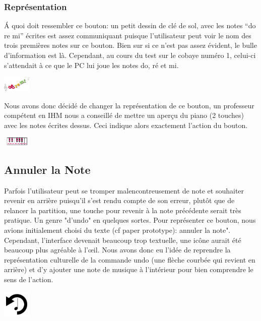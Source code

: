 \documentclass{article}
\begin{document}
\subsubsection{Représentation}
\'A quoi doit ressembler ce bouton: un petit dessin de clé de sol, avec les notes ``do re mi'' écrites est assez communiquant puisque
l'utilisateur peut voir le nom des trois premières notes sur ce bouton. Bien sur si ce n'est pas assez évident, le bulle d'information
est là. Cependant, au cours du test sur le cobaye numéro 1, celui-ci s'attendait à ce que le PC lui joue les notes do, ré et mi.
\begin{center}
\includegraphics[width = 50px]{./images/doremi.png}
\end{center}
Nous avons donc décidé de changer la représentation de ce bouton, un professeur compétent en IHM nous a conseillé de mettre
 un aperçu du piano (2 touches) avec les notes écrites dessus. Ceci indique alors exactement l'action du bouton.
 
\begin{center}
\includegraphics[width = 50px]{./images/doremi2.png}
\end{center}

\subsection{Annuler la Note}
Parfois l'utilisateur peut se tromper malencontreusement de note et souhaiter revenir en arrière puisqu'il s'est rendu compte de son erreur,
plutôt que de relancer la partition, une touche pour revenir à la note précédente serait très pratique. Un genre "d'undo" en quelques sortes.
Pour représenter ce bouton, nous avions initialement choisi du texte (cf paper prototype): annuler la note". Cependant, l'interface devenait beaucoup
trop textuelle, une icône aurait été beaucoup plus agréable à l’œil. Nous avons donc eu l'idée de reprendre la représentation culturelle de la commande
undo (une flèche courbée qui revient en arrière) et d'y ajouter une note de musique à l'intérieur pour bien comprendre le sens de l'action.

\begin{center}
\includegraphics[width = 50px]{./images/undo.png}
\end{center}
\end{document}
